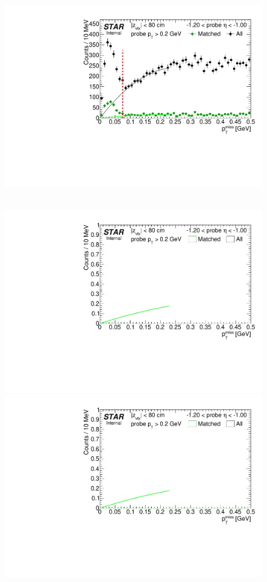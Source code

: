 \begin{figure}[ht]
{  \includegraphics[width=\linewidth,page=6]{graphics/systematicsEfficiency/TOF_tagAndProbe/Fitting_effVsEta_data.pdf}
}~
\parbox{0.495\textwidth}{
  \centering
  \includegraphics[width=\linewidth,page=3]{graphics/systematicsEfficiency/TOF_tagAndProbe/Fitting_effVsEta_mc.pdf}\\
  \includegraphics[width=\linewidth,page=4]{graphics/systematicsEfficiency/TOF_tagAndProbe/Fitting_effVsEta_mc.pdf}\\
}
\end{figure}
